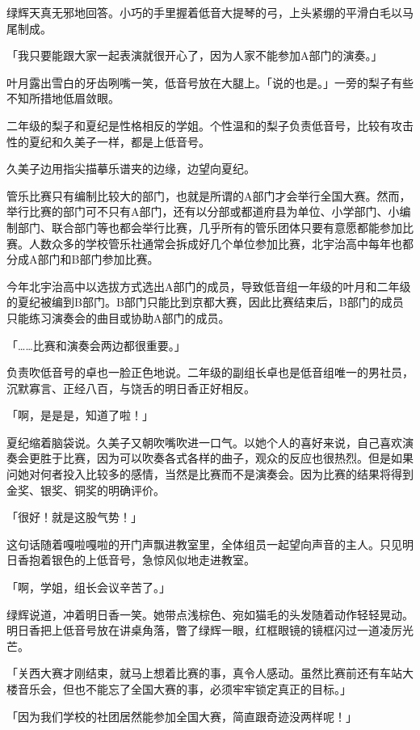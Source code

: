 \documentclass[UTF8]{ctexart}
\begin{document}
    绿辉天真无邪地回答。小巧的手里握着低音大提琴的弓，上头紧绷的平滑白毛以马尾制成。 

    「我只要能跟大家一起表演就很开心了，因为人家不能参加A部门的演奏。」 

    叶月露出雪白的牙齿咧嘴一笑，低音号放在大腿上。「说的也是。」一旁的梨子有些不知所措地低眉敛眼。 

    二年级的梨子和夏纪是性格相反的学姐。个性温和的梨子负责低音号，比较有攻击性的夏纪和久美子一样，都是上低音号。 

    久美子边用指尖描摹乐谱夹的边缘，边望向夏纪。 

    管乐比赛只有编制比较大的部门，也就是所谓的A部门才会举行全国大赛。然而，举行比赛的部门可不只有A部门，还有以分部或都道府县为单位、小学部门、小编制部门、联合部门等也都会举行比赛，几乎所有的管乐团体只要有意愿都能参加比赛。人数众多的学校管乐社通常会拆成好几个单位参加比赛，北宇治高中每年也都分成A部门和B部门参加比赛。 

    今年北宇治高中以选拔方式选出A部门的成员，导致低音组一年级的叶月和二年级的夏纪被编到B部门。B部门只能比到京都大赛，因此比赛结束后，B部门的成员只能练习演奏会的曲目或协助A部门的成员。 

    「……比赛和演奏会两边都很重要。」 

    负责吹低音号的卓也一脸正色地说。二年级的副组长卓也是低音组唯一的男社员，沉默寡言、正经八百，与饶舌的明日香正好相反。 

    「啊，是是是，知道了啦！」 

    夏纪缩着脑袋说。久美子又朝吹嘴吹进一口气。以她个人的喜好来说，自己喜欢演奏会更胜于比赛，因为可以吹奏各式各样的曲子，观众的反应也很热烈。但是如果问她对何者投入比较多的感情，当然是比赛而不是演奏会。因为比赛的结果将得到金奖、银奖、铜奖的明确评价。 

    「很好！就是这股气势！」 

    这句话随着嘎啦嘎啦的开门声飘进教室里，全体组员一起望向声音的主人。只见明日香抱着银色的上低音号，急惊风似地走进教室。 

    「啊，学姐，组长会议辛苦了。」 

    绿辉说道，冲着明日香一笑。她带点浅棕色、宛如猫毛的头发随着动作轻轻晃动。明日香把上低音号放在讲桌角落，瞥了绿辉一眼，红框眼镜的镜框闪过一道凌厉光芒。 

    「关西大赛才刚结束，就马上想着比赛的事，真令人感动。虽然比赛前还有车站大楼音乐会，但也不能忘了全国大赛的事，必须牢牢锁定真正的目标。」 

    「因为我们学校的社团居然能参加全国大赛，简直跟奇迹没两样呢！」 
\end{document}
